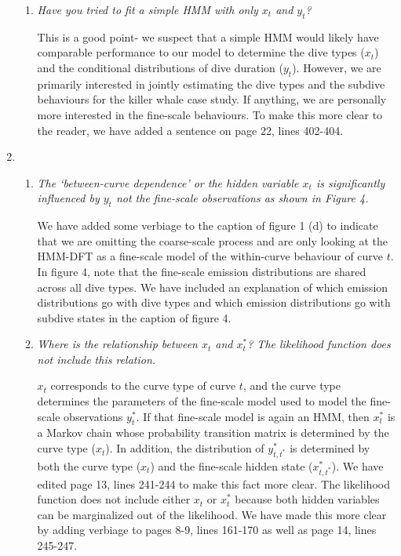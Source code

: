\documentclass{article}
\begin{document}
\begin{enumerate}
\begin{enumerate}
        \item \textit{Have you tried to fit a simple HMM with only $x_t$ and $y_t$?} 
        
        This is a good point- we suspect that a simple HMM would likely have comparable performance to our model to determine the dive types ($x_t$) and the conditional distributions of dive duration ($y_t$). However, we are primarily interested in jointly estimating the dive types and the subdive behaviours for the killer whale case study. If anything, we are personally more interested in the fine-scale behaviours. To make this more clear to the reader, we have added a sentence on page 22, lines 402-404.
        
    \end{enumerate}
    
    \item \begin{enumerate}
        \item \textit{The `between-curve dependence' or the hidden variable $x_t$ is significantly influenced by $y_t$ not the fine-scale observations as shown in Figure 4.}
        
        We have added some verbiage to the caption of figure 1 (d) to indicate that we are omitting the coarse-scale process and are only looking at the HMM-DFT as a fine-scale model of the within-curve behaviour of curve $t$. In figure 4, note that the fine-scale emission distributions are shared across all dive types. We have included an explanation of which emission distributions go with dive types and which emission distributions go with subdive states in the caption of figure 4. 
        
        \item \textit{Where is the relationship between $x_t$ and $x^*_t$? The likelihood function does not include this relation.}
        
        $x_t$ corresponds to the curve type of curve $t$, and the curve type determines the parameters of the fine-scale model used to model the fine-scale observations $y^*_t$. If that fine-scale model is again an HMM, then $x^*_t$ is a Markov chain whose probability transition matrix is determined by the curve type ($x_t$). In addition, the distribution of $y^*_{t,t^*}$ is determined by both the curve type ($x_t$) and the fine-scale hidden state ($x^*_{t,t^*}$). We have edited page 13, lines 241-244 to make this fact more clear. The likelihood function does not include either $x_t$ or $x^*_t$ because both hidden variables can be marginalized out of the likelihood. We have made this more clear by adding verbiage to pages 8-9, lines 161-170 as well as page 14, lines 245-247. 
        

\end{enumerate}
\end{enumerate}
\end{document}
